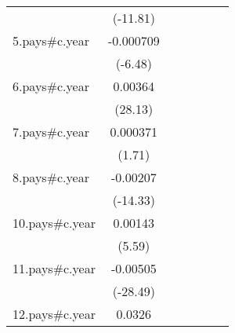 {\begin{tabular}{l*{6}{c}}
                    &    (-11.81)         &                     &                     &                     &                     &                     \\
[1em]
5.pays#c.year       &   -0.000709\sym{***}&                     &                     &                     &                     &                     \\
                    &     (-6.48)         &                     &                     &                     &                     &                     \\
[1em]
6.pays#c.year       &     0.00364\sym{***}&                     &                     &                     &                     &                     \\
                    &     (28.13)         &                     &                     &                     &                     &                     \\
[1em]
7.pays#c.year       &    0.000371         &                     &                     &                     &                     &                     \\
                    &      (1.71)         &                     &                     &                     &                     &                     \\
[1em]
8.pays#c.year       &    -0.00207\sym{***}&                     &                     &                     &                     &                     \\
                    &    (-14.33)         &                     &                     &                     &                     &                     \\
[1em]
10.pays#c.year      &     0.00143\sym{***}&                     &                     &                     &                     &                     \\
                    &      (5.59)         &                     &                     &                     &                     &                     \\
[1em]
11.pays#c.year      &    -0.00505\sym{***}&                     &                     &                     &                     &                     \\
                    &    (-28.49)         &                     &                     &                     &                     &                     \\
[1em]
12.pays#c.year      &      0.0326\sym{***}&                     &                     &                     &                     &                     \\

\end{tabular}}

